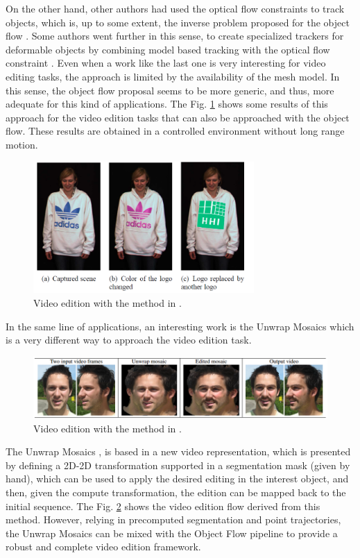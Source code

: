 On the other hand, other authors had used the optical flow constraints to track objects, 
which is, up to some extent, the inverse problem proposed for the object flow \cite{c37}. Some authors went further in this sense, to create specialized trackers 
for deformable objects by combining model based tracking with the optical flow constraint \cite{c38}. Even when a work like the last one is very interesting for video editing 
tasks, the approach is limited by the availability of the mesh model. In this sense, the object flow proposal seems to be more generic, and thus, more adequate for this kind 
of applications. The Fig. \ref{soa1} shows some results of this approach for the video edition tasks that can also be approached with the object flow. These results are obtained in 
a controlled environment without long range motion.

   \begin{figure}[thpb]
      \centering
      \includegraphics[width=0.75\textwidth]{../images/soa_app.png}
      \caption{  Video edition with the method in  \cite{c38}. }
      \label{soa1}
   \end{figure}

In the same line of applications, an interesting work is the Unwrap Mosaics \cite{c41} which is a very different way to approach the video edition task. 

   \begin{figure}[thpb]
      \centering
      \includegraphics[width=1.00\textwidth]{../images/soa_app2.png}
      \caption{  Video edition with the method in  \cite{c41}. }
      \label{soa2}
   \end{figure}

The Unwrap Mosaics \cite{c41}, is based in a new 
video representation, which is presented by defining a 2D-2D transformation supported in a segmentation mask (given by hand), which can be used to apply the desired editing in the 
interest object, and then, given the compute transformation, the edition can be mapped back to the initial sequence. The Fig. \ref{soa2} shows the video edition flow derived from 
this method. However, relying in precomputed segmentation and point trajectories, the Unwrap Mosaics can be mixed with the Object Flow pipeline to provide a robust and 
complete video edition framework.